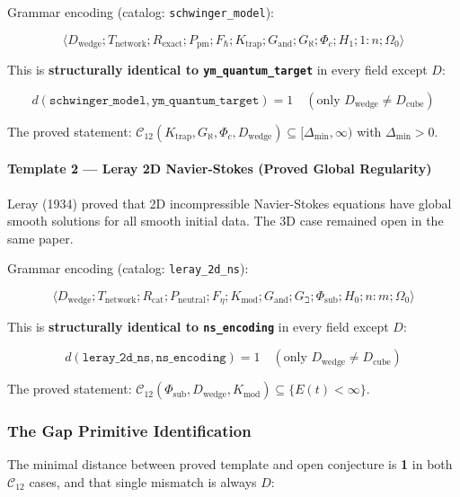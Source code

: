 \documentclass[12pt,a4paper]{article}
\begin{document}
Grammar encoding (catalog: \texttt{schwinger\_model}):


\[\langle D_\text{wedge}; T_\text{network}; R_\text{exact}; P_\text{pm}; F_{\hbar}; K_\text{trap}; G_\text{and}; G_{\aleph}; \Phi_c; H_1; 1{:}n; \Omega_0 \rangle\]

This is \textbf{structurally identical to \texttt{ym\_quantum\_target}} in every field except $D$:


\[d(\texttt{schwinger\_model}, \texttt{ym\_quantum\_target}) = 1 \quad (\text{only } D_\text{wedge} \neq D_\text{cube})\]

The proved statement: $\mathcal{C}_{12}(K_\text{trap}, G_{\aleph}, \Phi_c, D_\text{wedge}) \subseteq [\Delta_\text{min}, \infty)$ with $\Delta_\text{min} > 0$. 

\paragraph{Template 2 --- Leray 2D Navier-Stokes (Proved Global Regularity)}

Leray (1934) proved that 2D incompressible Navier-Stokes equations have global smooth solutions for all smooth initial data. The 3D case remained open in the same paper.

Grammar encoding (catalog: \texttt{leray\_2d\_ns}):


\[\langle D_\text{wedge}; T_\text{network}; R_\text{cat}; P_\text{neutral}; F_{\eta}; K_\text{mod}; G_\text{and}; G_{\beth}; \Phi_\text{sub}; H_0; n{:}m; \Omega_0 \rangle\]

This is \textbf{structurally identical to \texttt{ns\_encoding}} in every field except $D$:


\[d(\texttt{leray\_2d\_ns}, \texttt{ns\_encoding}) = 1 \quad (\text{only } D_\text{wedge} \neq D_\text{cube})\]

The proved statement: $\mathcal{C}_{12}(\Phi_\text{sub}, D_\text{wedge}, K_\text{mod}) \subseteq \{E(t) < \infty\}$. 

\subsubsection{The Gap Primitive Identification}

The minimal distance between proved template and open conjecture is \textbf{1} in both $\mathcal{C}_{12}$ cases, and that single mismatch is always $D$:
\end{document}
